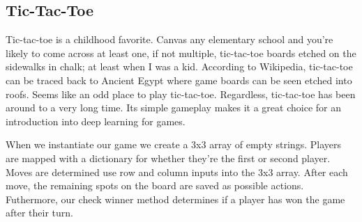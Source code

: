
\subsection{Tic-Tac-Toe}

Tic-tac-toe is a childhood favorite. Canvas any elementary school and you're likely to come across at least one, if not multiple, tic-tac-toe boards etched on the sidewalks in chalk; at least when I was a kid. According to Wikipedia, tic-tac-toe can be traced back to Ancient Egypt where game boards can be seen etched into roofs. Seems like an odd place to play tic-tac-toe. Regardless, tic-tac-toe has been around to a very long time. Its simple gameplay makes it a great choice for an introduction into deep learning for games.

When we instantiate our game we create a 3x3 array of empty strings. Players are mapped with a dictionary for whether they're the first or second player. Moves are determined use row and column inputs into the 3x3 array.  After each move, the remaining spots on the board are saved as possible actions.  Futhermore, our check winner method determines if a player has won the game after their turn.
